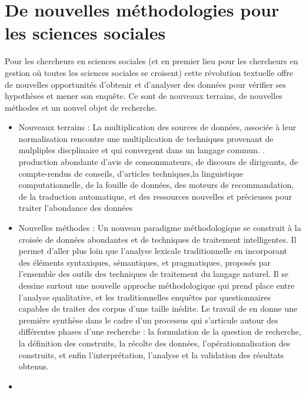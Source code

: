\documentclass[
]{book}
\begin{document}
\hypertarget{de-nouvelles-muxe9thodologies-pour-les-sciences-sociales}{%
\section{De nouvelles méthodologies pour les sciences sociales}\label{de-nouvelles-muxe9thodologies-pour-les-sciences-sociales}}

Pour les chercheurs en sciences sociales (et en premier lieu pour les chercheurs en gestion où toutes les sciences sociales se croisent) cette révolution textuelle offre de nouvelles opportunités d'obtenir et d'analyser des données pour vérifier ses hypothèses et mener son enquête. Ce sont de nouveaux terrains, de nouvelles méthodes et un nouvel objet de recherche.

\begin{itemize}
\item
  Nouveaux terrains : La multiplication des sources de données, associée à leur normalisation rencontre une multiplication de techniques provenant de mulpliples discplinaire et qui convergent dans un langage commun. . production abondante d'avis de consommateurs, de discours de dirigeants, de compte-rendus de conseils, d'articles techniques,la linguistique computationnelle, de la fouille de données, des moteurs de recommandation, de la traduction automatique, et des ressources nouvelles et précieuses pour traiter l'abondance des données
\item
  Nouvelles méthodes : Un nouveau paradigme méthodologique se construit à la croisée de données abondantes et de techniques de traitement intelligentes. Il permet d'aller plus loin que l'analyse lexicale traditionnelle en incorporant des éléments syntaxiques, sémantiques, et pragmatiques, proposés par l'ensemble des outils des techniques de traitement du langage naturel. Il se dessine surtout une nouvelle approche méthodologique qui prend place entre l'analyse qualitative, et les traditionnelles enquêtes par questionnaires capables de traiter des corpus d'une taille inédite. Le travail de \citep{humphreys_automated_2018} en donne une première synthèse dans le cadre d'un processus qui s'articule autour des différentes phases d'une recherche : la formulation de la question de recherche, la définition des construits, la récolte des données, l'opérationnalisation des construits, et enfin l'interprétation, l'analyse et la validation des résultats obtenus.
\item

\end{itemize}
\end{document}
